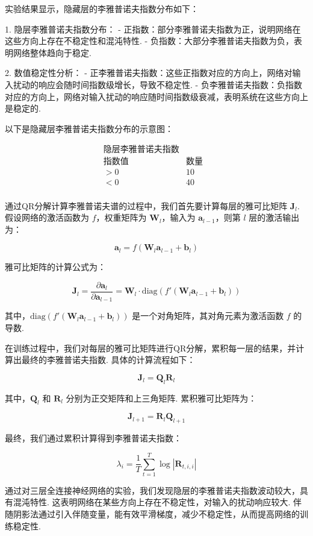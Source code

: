 实验结果显示，隐藏层的李雅普诺夫指数分布如下：



1. 隐层李雅普诺夫指数分布：
   - 正指数：部分李雅普诺夫指数为正，说明网络在这些方向上存在不稳定性和混沌特性. 
   - 负指数：大部分李雅普诺夫指数为负，表明网络整体趋向于稳定. 

2. 数值稳定性分析：
   - 正李雅普诺夫指数：这些正指数对应的方向上，网络对输入扰动的响应会随时间指数级增长，导致不稳定性. 
   - 负李雅普诺夫指数：负指数对应的方向上，网络对输入扰动的响应随时间指数级衰减，表明系统在这些方向上是稳定的. 

以下是隐藏层李雅普诺夫指数分布的示意图：

\[
\begin{array}{ccc}
\text{隐层李雅普诺夫指数} & & \\
\hline
\text{指数值} & \text{数量} \\
\hline
>0 & 10 \\
<0 & 40 \\
\end{array}
\]

通过QR分解计算李雅普诺夫谱的过程中，我们首先要计算每层的雅可比矩阵 \(\mathbf{J}_l\). 假设网络的激活函数为 \( f \)，权重矩阵为 \(\mathbf{W}_l\)，输入为 \(\mathbf{a}_{l-1}\)，则第 \(l\) 层的激活输出为：

\[
\mathbf{a}_l = f(\mathbf{W}_l \mathbf{a}_{l-1} + \mathbf{b}_l)
\]

雅可比矩阵的计算公式为：

\[
\mathbf{J}_l = \frac{\partial \mathbf{a}_l}{\partial \mathbf{a}_{l-1}} = \mathbf{W}_l \cdot \text{diag}(f'(\mathbf{W}_l \mathbf{a}_{l-1} + \mathbf{b}_l))
\]

其中，\(\text{diag}(f'(\mathbf{W}_l \mathbf{a}_{l-1} + \mathbf{b}_l))\) 是一个对角矩阵，其对角元素为激活函数 \(f\) 的导数. 

在训练过程中，我们对每层的雅可比矩阵进行QR分解，累积每一层的结果，并计算出最终的李雅普诺夫指数. 具体的计算流程如下：

\[
\mathbf{J}_l = \mathbf{Q}_l \mathbf{R}_l
\]

其中，\(\mathbf{Q}_l\) 和 \(\mathbf{R}_l\) 分别为正交矩阵和上三角矩阵. 累积雅可比矩阵为：

\[
\mathbf{J}_{l+1} = \mathbf{R}_l \mathbf{Q}_{l+1}
\]

最终，我们通过累积计算得到李雅普诺夫指数：

\[
\lambda_i = \frac{1}{T} \sum_{t=1}^T \log |\mathbf{R}_{t,i,i}|
\]

通过对三层全连接神经网络的实验，我们发现隐层的李雅普诺夫指数波动较大，具有混沌特性. 这表明网络在某些方向上存在不稳定性，对输入的扰动响应较大. 伴随阴影法通过引入伴随变量，能有效平滑梯度，减少不稳定性，从而提高网络的训练稳定性. 


